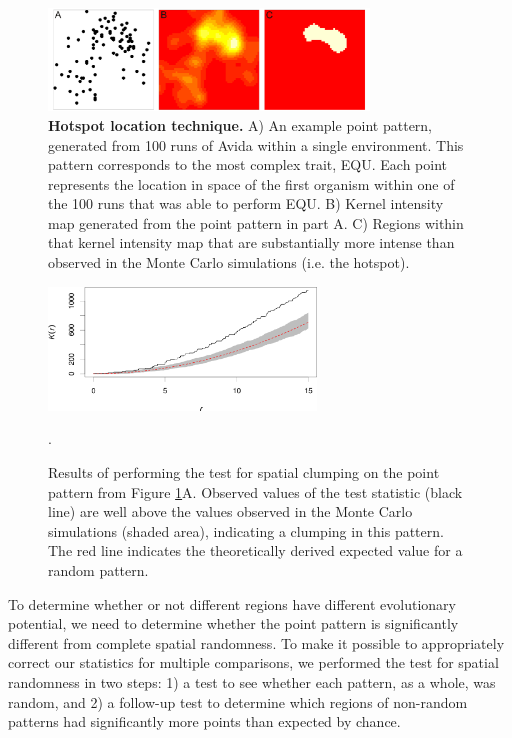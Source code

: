 \begin{figure}
\begin{center}
\includegraphics[width=3.35in]{figs/statsfig_horziontal_1col.png}
\caption{\textbf{Hotspot location technique.} A) An example point pattern, generated from 100 runs of Avida within a single environment. This pattern corresponds to the most complex trait, EQU. Each point represents the location in space of the first organism within one of the 100 runs that was able to perform EQU. B) Kernel intensity map generated from the point pattern in part A. C) Regions within that kernel intensity map that are substantially more intense than observed in the Monte Carlo simulations (i.e. the hotspot).}
\label{stats}
\end{center}
\end{figure}

\begin{figure}[t]
\begin{center}
\includegraphics[width=2.8in]{figs/9_50013_k-hat.png}
\caption{Results of performing the test for spatial clumping on the point pattern from Figure \ref{stats}A. Observed values of the test statistic (black line) are well above the values observed in the Monte Carlo simulations (shaded area), indicating a clumping in this pattern. The red line indicates the theoretically derived expected value for a random pattern.}. 
\label{khat}
\end{center}
\end{figure}

To determine whether or not different regions have different evolutionary potential, we need to determine whether the point pattern is significantly different from complete spatial randomness. To make it possible to appropriately correct our statistics for multiple comparisons, we performed the test for spatial randomness in two steps: 1) a test to see whether each pattern, as a whole, was random, and 2) a follow-up test to determine which regions of non-random patterns had significantly more points than expected by chance. 

